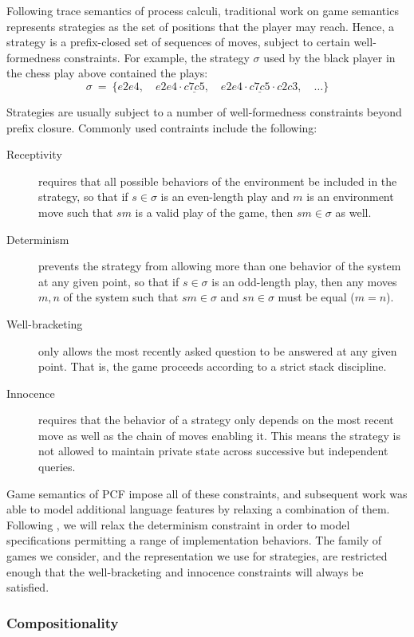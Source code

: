 \documentclass[acmsmall,timestamp,review,anonymous]{acmart}
\begin{document}
Following trace semantics of process calculi,
traditional work on game semantics
represents strategies as
the set of positions that the player may reach.
Hence,
a strategy is a prefix-closed set of sequences of moves,
subject to certain well-formedness constraints.
For example,
the strategy $\sigma$ used by
the black player in the chess play above
contained the plays:
\[
  \sigma \: = \: \{
    e2e4, \quad
    e2e4 \cdot \underline{c7c5}, \quad
    e2e4 \cdot \underline{c7c5} \cdot c2c3, \quad
    \ldots
  \}
\]

Strategies are usually subject to a number
of well-formedness constraints beyond prefix closure.
Commonly used contraints include the following:
\begin{description}
\item[Receptivity]
  requires that all possible behaviors of the environment
  be included in the strategy,
  so that if $s \in \sigma$ is an even-length play and
  $m$ is an environment move such that $sm$ is a valid play of the game,
  then $sm \in \sigma$ as well.
\item[Determinism]
  prevents the strategy from allowing
  more than one behavior of the system at any given point,
  so that if $s \in \sigma$ is an odd-length play,
  then any moves $m, n$ of the system
  such that $sm \in \sigma$ and $sn \in \sigma$
  must be equal ($m = n$).
\item[Well-bracketing]
  only allows the most recently asked question
  to be answered at any given point.
  That is,
  the game proceeds according to a strict stack discipline.
\item[Innocence]
  requires that the behavior of a strategy
  only depends on the most recent move
  as well as the chain of moves enabling it.
  This means the strategy is not allowed to maintain
  private state across
  successive but independent queries.
\end{description}
Game semantics of PCF \cite{pcfajm,pcfho,gamesem99}
impose all of these constraints,
and subsequent work was able to model additional language features
by relaxing a combination of them.
Following \cite{gsnondet},
we will relax the determinism constraint in order
to model specifications permitting
a range of implementation behaviors.
The family of games we consider,
and the representation we use for strategies,
are restricted enough that
the well-bracketing and innocence constraints
will always be satisfied.


\subsubsection{Compositionality} \label{sec:mainideas:gs:comp} %
\end{document}
